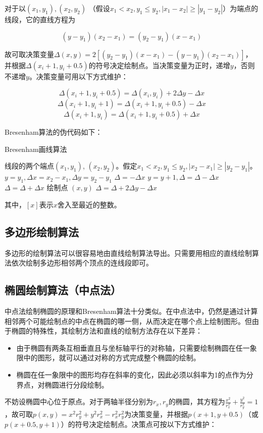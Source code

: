 \documentclass[a4paper,12pt]{article}
\begin{document}
对于以$(x_1, y_1), (x_2, y_2)$ （假设$x_1 < x_2, y_1 \leq y_2, |x_1 - x_2| \geq |y_1 - y_2|$）为端点的线段，它的直线方程为

$$ (y - y_1) (x_2 - x_1) = (y_2 - y_1)(x - x_1) $$

故可取决策变量$\Delta(x, y) = 2[(y_2 - y_1)(x - x_1) - (y - y_1)(x_2 - x_1)]$，并根据$\Delta(x_i+1, y_i+0.5)$的符号决定绘制点。当决策变量为正时，递增$y$，否则不递增$y$。决策变量可用以下方式维护：

$$ \Delta(x_i+1, y_i+0.5) = \Delta(x_i, y_i) + 2\Delta y - \Delta x $$
$$ \Delta(x_i+1, y_i+1) = \Delta(x_i+1, y_i+0.5) - \Delta x $$
$$ \Delta(x_i+1, y_i) = \Delta(x_i+1, y_i+0.5) + \Delta x $$

Bresenham算法的伪代码如下：

\begin{algorithm}[htb] 
\caption{Bresenham画线算法} 
\label{alg:Bresenham} 
\begin{algorithmic}[1] 
\Require 
线段的两个端点$(x_1, y_1)$, $(x_2, y_2)$。假定$x_1 < x_2, y_1 \leq y_2, |x_2 - x_1| \geq |y_2 - y_1|$。
\State $y = y_1, \Delta x = x_2 - x_1, \Delta y = y_2 - y_1$
\State $\Delta = -\Delta x$
	\State $y = y + 1, \Delta = \Delta - \Delta x$ 
	\Else
	\State $\Delta = \Delta + \Delta x$
	\EndIf
    \State 绘制点 $(x, y)$
    \State $\Delta = \Delta + 2\Delta y - \Delta x$
\EndFor
\end{algorithmic} 
\end{algorithm}

其中，$[x]$表示$x$舍入至最近的整数。

\subsection{多边形绘制算法}
多边形的绘制算法可以很容易地由直线绘制算法导出。只需要用相应的直线绘制算法依次绘制多边形相邻两个顶点的连线段即可。


\subsection{椭圆绘制算法（中点法）}
中点法绘制椭圆的原理和Bresenham算法十分类似。在中点法中，仍然是通过计算相邻两个可能绘制点的中点在椭圆的哪一侧，从而决定在哪个点上绘制图形。但由于椭圆的特殊性，其绘制方法和直线的绘制方法存在以下差异：

\begin{itemize}
	\item 由于椭圆有两条互相垂直且与坐标轴平行的对称轴，只需要绘制椭圆在任一象限中的图形，就可以通过对称的方式完成整个椭圆的绘制。
	\item 椭圆在任一象限中的图形均存在斜率的变化，因此必须以斜率为1的点作为分界点，对椭圆进行分段绘制。
\end{itemize}
不妨设椭圆中心位于原点。对于两轴半径分别为$r_x,r_y$的椭圆，其方程为$\frac{x^2}{r_x^2} + \frac{y^2}{r_y^2} = 1$，故可取$p(x, y) = x^2r_y^2 + y^2 r_x^2 - r_x^2r_y^2$为决策变量，并根据$p(x+1, y+0.5)$（或$p(x+0.5, y+1)$）的符号决定绘制点。决策点可按以下方式维护：
\end{document}
